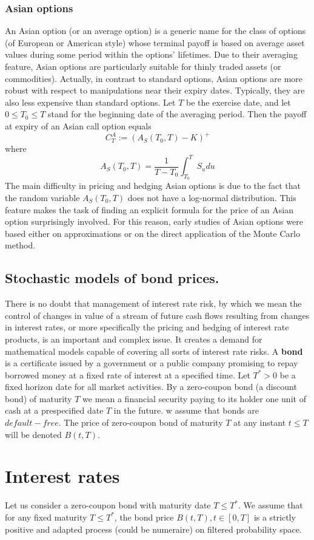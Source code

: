 \documentclass{book}
\begin{document}
\subsection{Asian options}
An Asian option (or an average option) is a generic name for the class of options (of European or
American style) whose terminal payoff is based on average asset values during some period within
the options' lifetimes. Due to their averaging feature, Asian options are particularly suitable for
thinly traded assets (or commodities). Actually, in contrast to standard options, Asian options are
more robust with respect to manipulations near their expiry dates. Typically, they are also less
expensive than standard options. Let $T$ be the exercise date, and let $0\leq T_{0}\leq T$ stand for the beginning date of the averaging period. Then the payoff at expiry of an Asian call option equals
$$
C_{T}^{A}:=(A_{S}(T_{0},T)-K)^{+}
$$
where 
$$
A_{S}(T_{0},T)=\frac{1}{T-T_{0}}\int_{T_{0}}^{T}S_{u}du
$$
The main difficulty
in pricing and hedging Asian options is due to the fact that the random variable $A_{S}(T_{0}, T)$ does not have a log-normal distribution. This feature makes the task of finding an explicit formula for the price of an Asian option surprisingly involved. For this reason, early studies of Asian options were based either on approximations or on the direct application of the Monte Carlo method.
\section{Stochastic models of bond prices.}
There is no doubt that management of interest rate risk, by which we mean the control of changes in
value of a stream of future cash flows resulting from changes in interest rates, or
more specifically the pricing and hedging of interest rate products, is an important
and complex issue. It creates a demand for mathematical models capable of covering
all sorts of interest rate risks.
A \textbf{bond} is a certificate issued by a government or a public company promising to repay borrowed money at a fixed rate of interest at a specified time. Let $T^{\ast}> 0$ be a fixed horizon date for all market activities. By a zero-coupon bond (a discount bond) of maturity $T$ we mean a financial security paying to its holder one unit of cash at a prespecified date $T$ in the future. w assume that bonds are $default-free$.
The price of zero-coupon bond of maturity $T$ at any instant $t\leq T$ will be denoted $B(t,T)$.
\chapter{Interest rates}
Let us consider a zero-coupon bond with maturity date $T\leq T^{\ast}$. We assume that for any fixed maturity $T\leq T^{\ast}$, the bond price $B(t,T),t\in[0,T]$ is a strictly positive and adapted process (could be numeraire) on filtered probability space.
\end{document}
